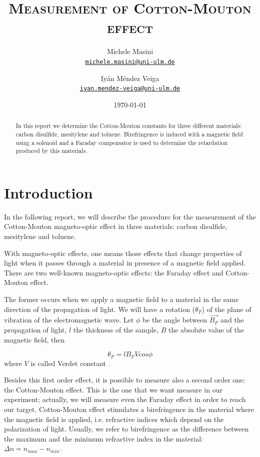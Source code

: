 \documentclass[11pt,a4paper]{article}
\title{\bfseries\textsc{Measurement of Cotton-Mouton effect}}
\author{
Michele Masini\\ \small\texttt{\href{mailto:michele.masini@uni-ulm.de}{michele.masini@uni-ulm.de}}\and
Iyán Méndez Veiga\\ \small\texttt{\href{mailto:iyan.mendez-veiga@uni-ulm.de}{iyan.mendez-veiga@uni-ulm.de}}
}
\date{\today}
\begin{document}
\maketitle

\begin{abstract}
In this report we determine the Cotton-Mouton constants for three different materials: carbon disulfide, mesitylene and toluene. Birefringence is induced with a magnetic field using a solenoid and a Faraday compensator is used to determine the retardation produced by this materials.
\end{abstract}

\vspace{1.5cm}

\section{Introduction}

\vspace{.5cm}
In the following report, we will describe the procedure for the measurement of the Cotton-Mouton magneto-optic effect in three materials: carbon disulfide, mesitylene and toluene.

With magneto-optic effects, one means those effects that change properties of light when it passes through a material in presence of a magnetic field applied. There are two well-known magneto-optic effects: the Faraday effect and Cotton-Mouton effect.
	
The former occurs when we apply a magnetic field to a material in the same direction of the propagation of light. We will have a rotation ($\theta_F$) of the plane of vibration of the electromagnetic wave. Let $\phi$ be the angle between $\vec{B_F}$ and the propagation of light, $l$ the thickness of the sample, $B$ the absolute value of the magnetic field, then

\begin{equation}\label{verd}
\theta_F=lB_F Vcos\phi
\end{equation}
where $V$ is called Verdet constant \cite{cappelli2003cotton}. 

Besides this first order effect, it is possible to measure also a second order one: the Cotton-Mouton effect. This is the one that we want measure in our experiment; actually, we will measure even the Faraday effect in order to reach our target. Cotton-Mouton effect stimulates a birefringence in the material where the magnetic field is applied, i.e. refractive indices which depend on the polarization of light. Usually, we refer to birefringence as the difference between the maximum and the minimum refractive index in the material: $\Delta n=n_{max}-n_{min}$.
\end{document}
